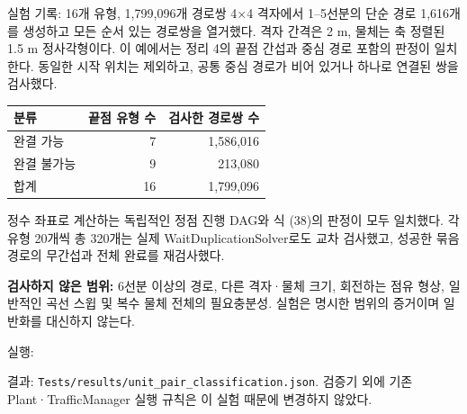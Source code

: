 \begin{frame}{실험 기록: 16개 유형, 1,799,096개 경로쌍}
\small
4$\times$4 격자에서 1--5선분의 단순 경로 1,616개를 생성하고 모든 순서 있는 경로쌍을 열거했다.
격자 간격은 2 m, 물체는 축 정렬된 1.5 m 정사각형이다.
이 예에서는 정리 4의 끝점 간섭과 중심 경로 포함의 판정이 일치한다.
동일한 시작 위치는 제외하고, 공통 중심 경로가 비어 있거나 하나로 연결된 쌍을 검사했다.
\begin{center}\begin{tabular}{lrr}\toprule
분류 & 끝점 유형 수 & 검사한 경로쌍 수\\\midrule
완결 가능 & 7 & 1,586,016\\
완결 불가능 & 9 & 213,080\\\midrule
합계 & 16 & 1,799,096\\\bottomrule
\end{tabular}\end{center}
정수 좌표로 계산하는 독립적인 정점 진행 DAG와 식 (38)의 판정이 모두 일치했다.
각 유형 20개씩 총 320개는 실제 WaitDuplicationSolver로도 교차 검사했고,
성공한 묶음 경로의 무간섭과 전체 완료를 재검사했다.
\par\medskip
\textbf{검사하지 않은 범위:} 6선분 이상의 경로, 다른 격자·물체 크기,
회전하는 점유 형상, 일반적인 곡선 스윕 및 복수 물체 전체의 필요충분성.
실험은 명시한 범위의 증거이며 일반화를 대신하지 않는다.
\par\smallskip\scriptsize
실행: \texttt{}\par
결과: \texttt{Tests/results/unit\_pair\_classification.json}.
검증기 외에 기존 Plant·TrafficManager 실행 규칙은 이 실험 때문에 변경하지 않았다.
\end{frame}

